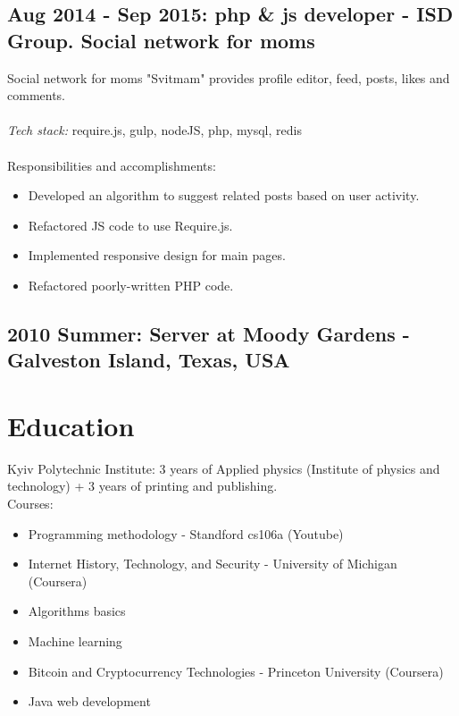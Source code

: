 \documentclass[a4paper, 14pt]{article}
\begin{document}
  \subsection{Aug 2014 - Sep 2015: php \& js developer - ISD Group. Social network for moms}
    Social network for moms "Svitmam" provides profile editor, feed, posts, likes and comments. \\
  \\
  \textit{Tech stack:} require.js, gulp, nodeJS, php, mysql, redis \\
  \\
  Responsibilities and accomplishments:
  \begin{itemize}
    \item Developed an algorithm to suggest related posts based on user activity. \\
    \item Refactored JS code to use Require.js. \\
    \item Implemented responsive design for main pages. \\
    \item Refactored poorly-written PHP code.
  \end{itemize}

  \subsection{2010 Summer: Server at Moody Gardens - Galveston Island, Texas, USA}

\section{Education}
  Kyiv Polytechnic Institute: 3 years of Applied physics (Institute of physics and technology) + 3 years of printing and publishing. \\
  Courses:
  \begin{itemize}
    \item Programming methodology - Standford cs106a (Youtube) \\
    \item Internet History, Technology, and Security - University of Michigan (Coursera) \\
    \item Algorithms basics \\
    \item Machine learning \\
    \item Bitcoin and Cryptocurrency Technologies - Princeton University (Coursera) \\
    \item Java web development
  \end{itemize}
\end{document}
